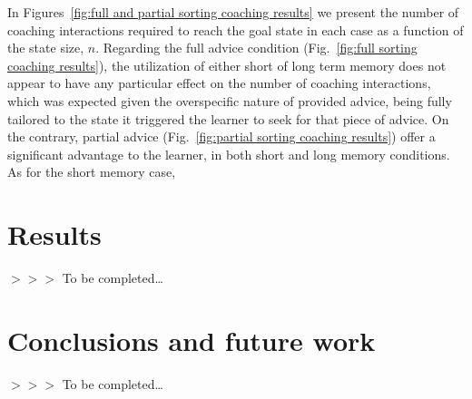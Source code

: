 \documentclass{ecai}
\newcommand{\edcom}[1]{{\sf\color{red}$>>>$ #1}}
\newcommand{\tbc}{\edcom{To be completed\ldots}}
\begin{document}
	In Figures~\ref{fig:full and partial sorting coaching results} we present the number of coaching interactions required to reach the goal state in each case as a function of the state size, $n$. Regarding the full advice condition (Fig.~\ref{fig:full sorting coaching results}), the utilization of either short of long term memory does not appear to have any particular effect on the number of coaching interactions, which was expected given the overspecific nature of provided advice, being fully tailored to the state it triggered the learner to seek for that piece of advice. On the contrary, partial advice (Fig.~\ref{fig:partial sorting coaching results}) offer a significant advantage to the learner, in both short and long memory conditions. As for the short memory case, 
	\section{Results}\label{sec:results}
	\tbc
	\section{Conclusions and future work}\label{sec:conclusions-and-future-work}
	\tbc
	
\end{document}
